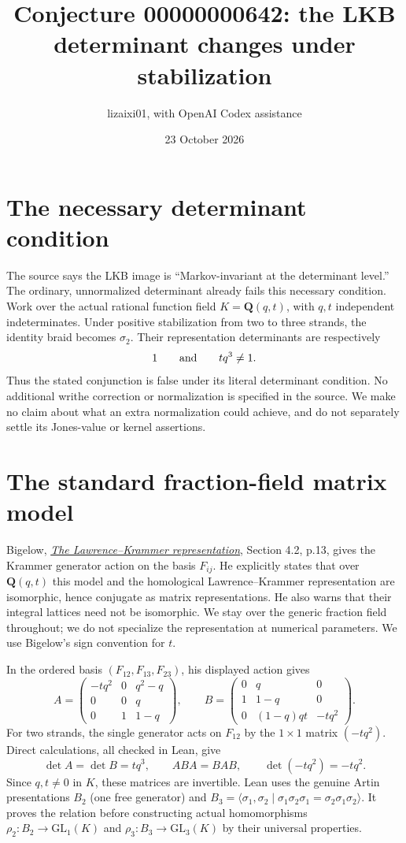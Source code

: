 \documentclass[11pt]{article}
\title{Conjecture 00000000642: the LKB determinant changes under stabilization}
\author{lizaixi01, with OpenAI Codex assistance}
\date{23 October 2026}
\begin{document}
\maketitle
\section{The necessary determinant condition}
The source says the LKB image is ``Markov-invariant at the determinant
level.'' The ordinary, unnormalized determinant already fails this
necessary condition. Work over the actual rational function field
$K=\mathbf Q(q,t)$, with $q,t$ independent indeterminates. Under positive
stabilization from two to three strands, the identity braid becomes
$\sigma_2$. Their representation determinants are respectively
\[
 1 \qquad\hbox{and}\qquad tq^3\ne1.
\]
Thus the stated conjunction is false under its literal determinant
condition. No additional writhe correction or normalization is specified
in the source. We make no claim about what an extra normalization could
achieve, and do not separately settle its Jones-value or kernel assertions.

\section{The standard fraction-field matrix model}
Bigelow, \href{https://arxiv.org/abs/math/0204057}
{\emph{The Lawrence--Krammer representation}}, Section 4.2, p.13,
gives the Krammer generator action on the basis $F_{ij}$.
He explicitly states that over $\mathbf Q(q,t)$ this model and the
homological Lawrence--Krammer representation are isomorphic, hence
conjugate as matrix representations. He also warns that their integral
lattices need not be isomorphic. We stay over the generic fraction field
throughout; we do not specialize the representation at numerical parameters.
We use Bigelow's sign convention for $t$.

In the ordered basis $(F_{12},F_{13},F_{23})$, his displayed action gives
\[
 A=\begin{pmatrix}-tq^2&0&q^2-q\\0&0&q\\0&1&1-q\end{pmatrix},\qquad
 B=\begin{pmatrix}0&q&0\\1&1-q&0\\0&(1-q)qt&-tq^2\end{pmatrix}.
\]
For two strands, the single generator acts on $F_{12}$ by the
$1\times1$ matrix $(-tq^2)$. Direct calculations, all checked in Lean,
give
\[
 \det A=\det B=tq^3,\qquad ABA=BAB,\qquad \det(-tq^2)=-tq^2.
\]
Since $q,t\ne0$ in $K$, these matrices are invertible.
Lean uses the genuine Artin presentations $B_2$ (one free generator)
and $B_3=\langle\sigma_1,\sigma_2\mid
\sigma_1\sigma_2\sigma_1=\sigma_2\sigma_1\sigma_2\rangle$.
It proves the relation before constructing actual homomorphisms
$\rho_2:B_2\to\mathrm{GL}_1(K)$ and
$\rho_3:B_3\to\mathrm{GL}_3(K)$ by their universal properties.
\end{document}
